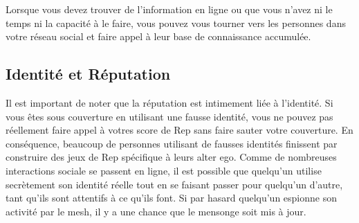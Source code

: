 Lorsque vous devez trouver de l'information en ligne ou que vous n'avez ni le temps ni la capacité à le faire, vous pouvez vous tourner vers les personnes dans votre réseau social et faire appel à leur base de connaissance accumulée. 

\subsection{Identité et Réputation} 

Il est important de noter que la réputation est intimement liée à l'identité. Si vous êtes sous couverture en utilisant une fausse identité, vous ne pouvez pas réellement faire appel à votres score de Rep sans faire sauter votre couverture. En conséquence, beaucoup de personnes utilisant de fausses identités finissent par construire des jeux de Rep spécifique à leurs alter ego. Comme de nombreuses interactions sociale se passent en ligne, il est possible que quelqu'un utilise secrètement son identité réelle tout en se faisant passer pour quelqu'un d'autre, tant qu'ils sont attentifs à ce qu'ils font. Si par hasard quelqu'un espionne son activité par le mesh, il y a une chance que le mensonge soit mis à jour. 



